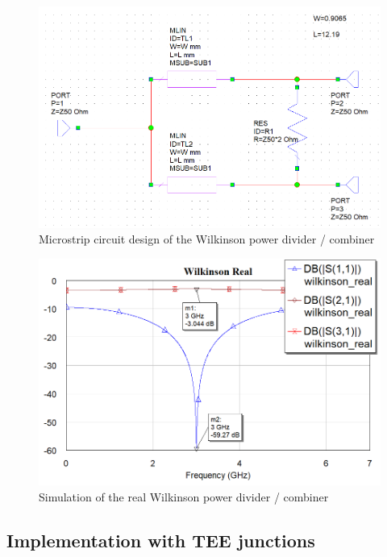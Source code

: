 \documentclass[12pt]{report} %
\begin{document}
\begin{figure}[htbp]
    \centering
    \includegraphics[width=1\linewidth]{images//microstrip_elements/wilkinson_real_circuit.png}
    \caption{Microstrip circuit design of the Wilkinson power divider / combiner}
    \label{fig:microstrip_elements:wilkinson_real_circuit}
\end{figure}

\begin{figure}[htbp]
    \centering
    \includegraphics[width=1\linewidth]{images//microstrip_elements/wilkinson_real_graph.png}
    \caption{Simulation of the real Wilkinson power divider / combiner}
    \label{fig:microstrip_elements:wilkinson_real_graph}
\end{figure}

\subsection{Implementation with TEE junctions}
\end{document}

